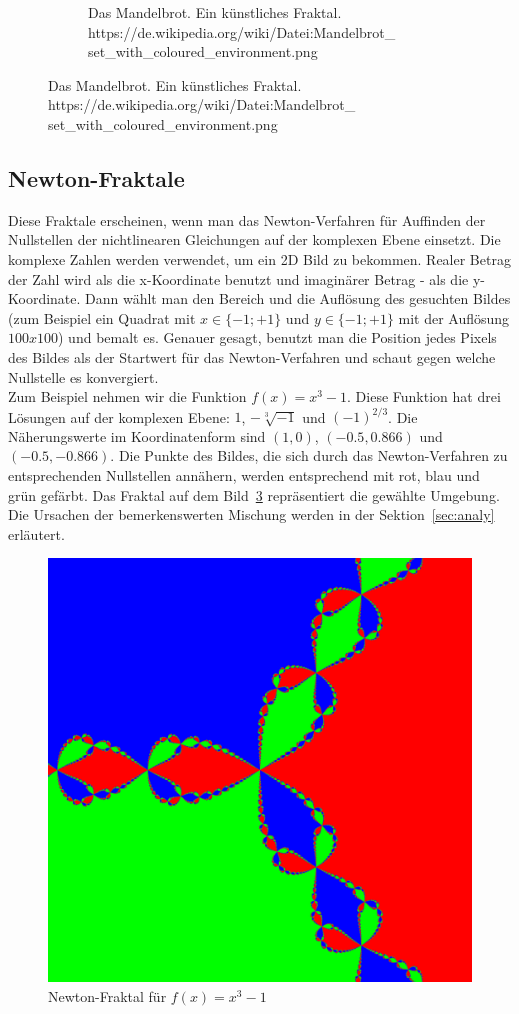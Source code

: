 \documentclass[a4paper,12pt]{llncs}
\numberwithin{equation}{section}
\begin{document}
\begin{figure}[ht]
\begin{subfigure}{.5\textwidth}
		\caption{Das Mandelbrot. Ein künstliches Fraktal.\\\tiny{https://de.wikipedia.org/wiki/Datei:Mandelbrot\_\\set\_with\_coloured\_environment.png}}
		\label{fig:frac_math}
	\end{subfigure}%
\end{figure}

\subsection{Newton-Fraktale}
Diese Fraktale erscheinen, wenn man das Newton-Verfahren für Auffinden der Nullstellen der nichtlinearen Gleichungen auf der komplexen Ebene einsetzt. 
Die komplexe Zahlen werden verwendet, um ein 2D Bild zu bekommen.
Realer Betrag der Zahl wird als die x-Koordinate benutzt und imaginärer Betrag - als die y-Koordinate.
Dann wählt man den Bereich und die Auflösung des gesuchten Bildes (zum Beispiel ein Quadrat mit $x\in\{-1;+1\}$ und $y\in\{-1;+1\}$ mit der Auflösung $100x100$) und bemalt es.
Genauer gesagt, benutzt man die Position jedes Pixels des Bildes als der Startwert für das Newton-Verfahren und schaut gegen welche Nullstelle es konvergiert.\\
Zum Beispiel nehmen wir die Funktion $f(x) = x^3 -1$. 
Diese Funktion hat drei Lösungen auf der komplexen Ebene: $1$, $-\sqrt[3]{-1}$ und $(-1)^{2/3}$. 
Die Näherungswerte im Koordinatenform sind $(1, 0)$, $(-0.5, 0.866)$ und $(-0.5, -0.866)$. 
Die Punkte des Bildes, die sich durch das Newton-Verfahren zu entsprechenden Nullstellen annähern, werden entsprechend mit rot, blau und grün gefärbt.
Das Fraktal auf dem Bild~\ref{fig:output3_0} repräsentiert die gewählte Umgebung.
Die Ursachen der bemerkenswerten Mischung werden in der Sektion~\ref{sec:analy} erläutert.
\begin{figure}[ht]   
	\centering
	\includegraphics[width=.5\linewidth]{figures/output3_0}
	\caption{Newton-Fraktal für $f(x)=x^3-1$ }
	\label{fig:output3_0}
\end{figure}
\end{document}
